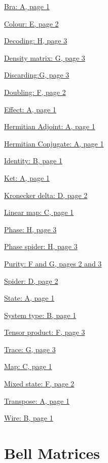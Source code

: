 \documentclass[]{article}
\begin{document}
\hyperref[braandket]{Bra: A, page 1}

\hyperref[coloursandbases]{Colour: E, page 2}

\hyperref[phasespiders]{Decoding: H, page 3}

\hyperref[discarding]{Density matrix: G, page 3}

\hyperref[discarding]{Discarding:G, page 3}

\hyperref[doubling]{Doubling: F, page 2}

\hyperref[braandket]{Effect: A, page 1}

\hyperref[braandket]{Hermitian Adjoint: A, page 1}

\hyperref[braandket]{Hermitian Conjugate: A, page 1}

\hyperref[identity]{Identity: B, page 1}

\hyperref[braandket]{Ket: A, page 1}

\hyperref[spiders]{Kronecker delta: D, page 2}

\hyperref[maps]{Linear map: C, page 1}

\hyperref[phasespiders]{Phase: H, page 3}

\hyperref[phasespiders]{Phase spider: H, page 3}

\hyperref[doubling]{Purity: F and G, pages 2 and 3}

\hyperref[spiders]{Spider: D, page 2}

\hyperref[braandket]{State: A, page 1}

\hyperref[identity]{System type: B, page 1}

\hyperref[doubling]{Tensor product: F, page 3}

\hyperref[discarding]{Trace: G, page 3}

\hyperref[maps]{Map: C, page 1}

\hyperref[doubling]{Mixed state: F, page 2}

\hyperref[braandket]{Transpose: A, page 1}

\hyperref[identity]{Wire: B, page 1}

\section{Bell Matrices}
\end{document}
